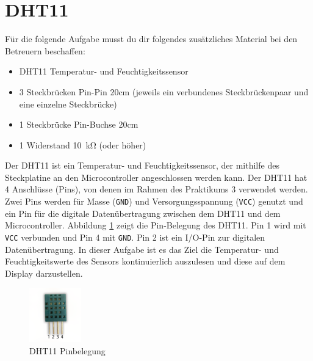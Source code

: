 \clearpage
\section{\ExercisePrefixEmbeddedC DHT11 \optional}

\optionaltextboxC

Für die folgende Aufgabe musst du dir folgendes zusätzliches Material bei den Betreuern beschaffen:
\begin{itemize}
\item DHT11 Temperatur- und Feuchtigkeitssensor
\item 3 Steckbrücken Pin-Pin 20cm (jeweils ein verbundenes Steckbrückenpaar und eine einzelne Steckbrücke)
\item 1 Steckbrücke Pin-Buchse 20cm
\item 1 Widerstand \SI{10}{\kilo\ohm} (oder höher)
\end{itemize}

Der DHT11 ist ein Temperatur- und Feuchtigkeitssensor, der mithilfe des Steckplatine an den Microcontroller angeschlossen werden kann.
Der DHT11 hat 4 Anschlüsse (Pins), von denen im Rahmen des Praktikums 3 verwendet werden.
Zwei Pins werden für Masse (\lstinline|GND|) und Versorgungsspannung (\lstinline|VCC|) genutzt und ein Pin für die digitale Datenübertragung zwischen dem DHT11 und dem Microcontroller.
Abbildung \ref{fig:dht11Pins} zeigt die Pin-Belegung des DHT11.
Pin 1 wird mit \lstinline|VCC| verbunden und Pin 4 mit \lstinline|GND|.
Pin 2 ist ein I/O-Pin zur digitalen Datenübertragung.
In dieser Aufgabe ist es das Ziel die Temperatur- und Feuchtigkeitswerte des Sensors kontinuierlich auszulesen und diese auf dem Display darzustellen.
\begin{figure}[!htb]
	\centering
	\includegraphics[width=0.2\textwidth]{./05_c/figures/DHT11.png}
	\caption{DHT11 Pinbelegung}
	\label{fig:dht11Pins}
\end{figure} 

